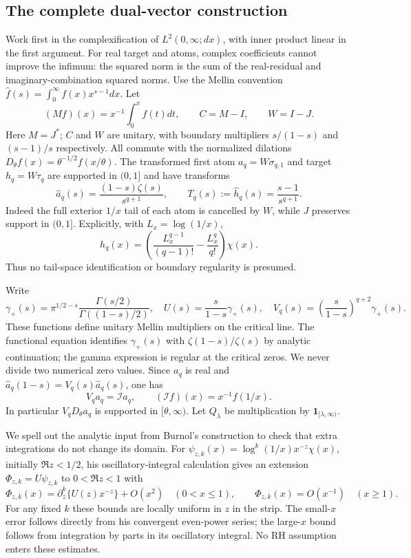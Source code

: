\subsection{The complete dual-vector construction}
Work first in the complexification of $L^2(0,\infty;dx)$, with inner
product linear in the first argument. For real target and atoms,
complex coefficients cannot improve the infimum: the squared norm is
the sum of the real-residual and imaginary-combination squared norms.
Use the Mellin convention $\widehat f(s)=\int_0^\infty f(x)x^{s-1}dx$.
Let
\[
 (Mf)(x)=x^{-1}\int_0^x f(t)dt,\qquad C=M-I,\qquad W=I-J.
\]
Here $M=J^*$; $C$ and $W$ are unitary, with boundary multipliers
$s/(1-s)$ and $(s-1)/s$ respectively. All commute with the normalized
dilations $D_\theta f(x)=\theta^{-1/2}f(x/\theta)$.
The transformed first atom $a_q=W\sigma_{q,1}$ and target $h_q=W\tau_q$
are supported in $(0,1]$ and have transforms
\begin{equation}
 \widehat a_q(s)=\frac{(1-s)\zeta(s)}{s^{q+1}},\qquad
 T_q(s):=\widehat h_q(s)=\frac{s-1}{s^{q+1}}.
 \label{eq:ns83-transforms}
\end{equation}
Indeed the full exterior $1/x$ tail of each atom is cancelled by $W$,
while $J$ preserves support in $(0,1]$. Explicitly, with $L_x=\log(1/x)$,
\[
 h_q(x)=\left(\frac{L_x^{q-1}}{(q-1)!}
             -\frac{L_x^q}{q!}\right)\chi(x).
\]
Thus no tail-space identification or boundary regularity is presumed.

Write
\[
 \gamma_+(s)=\pi^{1/2-s}\frac{\Gamma(s/2)}{\Gamma((1-s)/2)},
 \quad U(s)=\frac{s}{1-s}\gamma_+(s),
 \quad V_q(s)=\left(\frac{s}{1-s}\right)^{q+2}\gamma_+(s).
\]
These functions define unitary Mellin multipliers on the critical line.
The functional equation identifies $\gamma_+(s)$ with
$\zeta(1-s)/\zeta(s)$ by analytic continuation; the gamma expression is
regular at the critical zeros. We never divide two numerical zero values.
Since $a_q$ is real and
$\widehat a_q(1-s)=V_q(s)\widehat a_q(s)$, one has
\[
 V_q a_q=\mathcal I a_q,\qquad
 (\mathcal I f)(x)=x^{-1}f(1/x).
\]
In particular $V_qD_\theta a_q$ is supported in $[\theta,\infty)$.
Let $Q_\lambda$ be multiplication by $\mathbf1_{[\lambda,\infty)}$.

We spell out the analytic input from Burnol's construction to check that
extra integrations do not change its domain. For
$\psi_{z,k}(x)=\log^k(1/x)x^{-z}\chi(x)$, initially $\Re z<1/2$,
his oscillatory-integral calculation
\cite[Section 4, especially the expansion preceding Theorem 4.11]{BurnolLower2002}
gives an extension $\Phi_{z,k}=U\psi_{z,k}$ to $0<\Re z<1$ with
\[
 \Phi_{z,k}(x)=\partial_z^k\{U(z)x^{-z}\}+O(x^2)
                   \quad(0<x\leq1),\qquad
 \Phi_{z,k}(x)=O(x^{-1})\quad(x\geq1).
\]
For any fixed $k$ these bounds are locally uniform in $z$ in the strip.
The small-$x$ error follows directly from his convergent even-power
series; the large-$x$ bound follows from integration by parts in its
oscillatory integral. No RH assumption enters these estimates.

